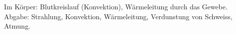 Im Körper: Blutkreislauf (Konvektion), Wärmeleitung durch das Gewebe. Abgabe: Strahlung, Konvektion, Wärmeleitung, Verdunstung von Schweiss, Atmung.
